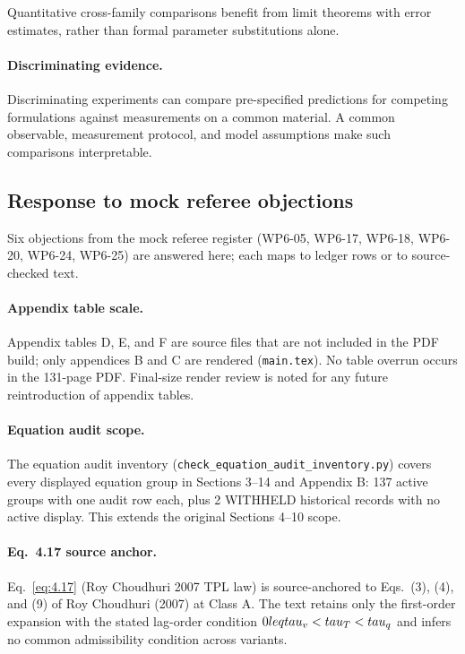Quantitative cross-family comparisons benefit from limit theorems with error estimates, rather than formal parameter substitutions alone.

\paragraph{Discriminating evidence.}

Discriminating experiments can compare pre-specified predictions for competing formulations against measurements on a common material. A common observable, measurement protocol, and model assumptions make such comparisons interpretable.

\subsection{Response to mock referee objections}

\label{sec:17.6}

Six objections from the mock referee register (WP6-05, WP6-17, WP6-18, WP6-20, WP6-24, WP6-25) are answered here; each maps to ledger rows or to source-checked text.

\paragraph{Appendix table scale.} Appendix tables D, E, and F are source files that are not included in the PDF build; only appendices B and C are rendered (\texttt{main.tex}). No table overrun occurs in the 131-page PDF. Final-size render review is noted for any future reintroduction of appendix tables.

\paragraph{Equation audit scope.} The equation audit inventory (\texttt{check\_equation\_audit\_inventory.py}) covers every displayed equation group in Sections 3--14 and Appendix B: 137 active groups with one audit row each, plus 2 WITHHELD historical records with no active display. This extends the original Sections 4--10 scope.

\paragraph{Eq.~4.17 source anchor.} Eq.~\eqref{eq:4.17} (Roy Choudhuri 2007 TPL law) is source-anchored to Eqs.~(3), (4), and (9) of Roy Choudhuri (2007) at Class A. The text retains only the first-order expansion with the stated lag-order condition $0\\leq\\tau_v<\\tau_T<\\tau_q$ and infers no common admissibility condition across variants.

